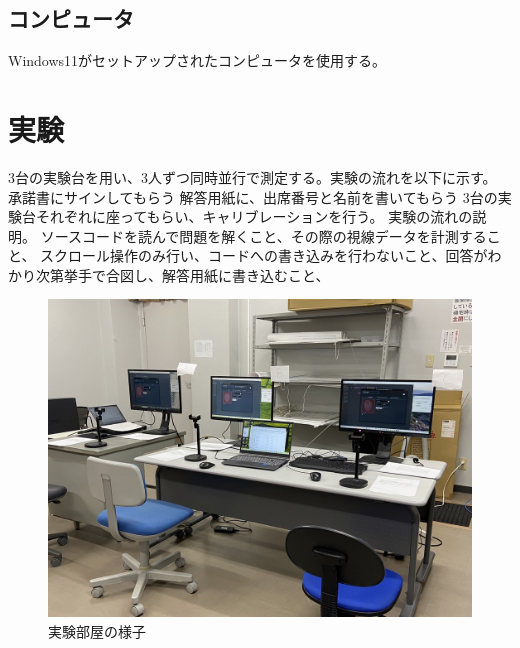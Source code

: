 \documentclass[paper=a4paper,fontsize=11pt]{jlreq}
\begin{document}
    \subsection{コンピュータ}
      Windows11がセットアップされたコンピュータを使用する。


  \section{実験}
    3台の実験台を用い、3人ずつ同時並行で測定する。実験の流れを以下に示す。\\
    
    承諾書にサインしてもらう
    解答用紙に、出席番号と名前を書いてもらう
    3台の実験台それぞれに座ってもらい、キャリブレーションを行う。
    実験の流れの説明。
    ソースコードを読んで問題を解くこと、その際の視線データを計測すること、
    スクロール操作のみ行い、コードへの書き込みを行わないこと、回答がわかり次第挙手で合図し、解答用紙に書き込むこと、


    \begin{figure}[htbp]
      \centering
      \includegraphics[width=0.8\linewidth]{実験部屋.jpg}
      \caption{実験部屋の様子}
    \end{figure}
    \FloatBarrier
  
\end{document}
